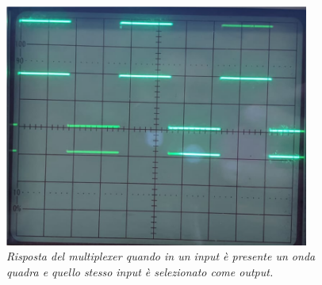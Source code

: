 \begin{figure}[H]
   \centering
        \centering
        \includegraphics[width=10cm]{../assets/sinusoide.png}
        \caption{\emph{Risposta del multiplexer quando in un input è presente un onda quadra e quello stesso input è selezionato come output.}}
    \label{fig:multiplexer-wave}
  \end{figure}